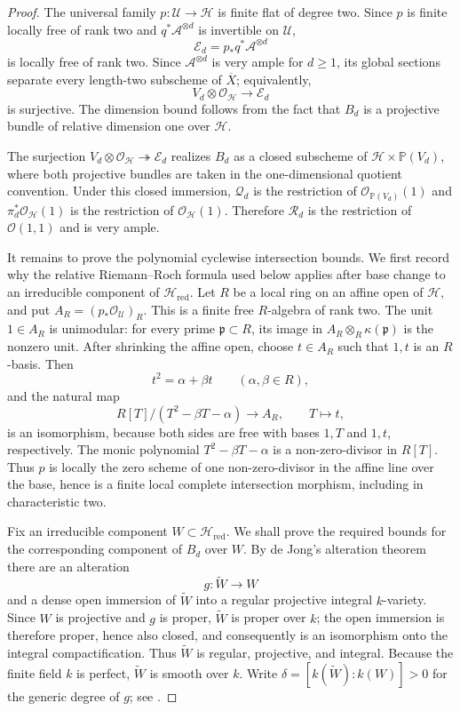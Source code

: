 \documentclass{lms}
\newcommand{\PP}{\mathbb P}
\newcommand{\Ample}{\mathcal A}
\newcommand{\OO}{\mathcal O}
\newcommand{\barX}{\overline{X}}
\begin{document}
\begin{proof}
The universal family $p:\mathcal U\to\mathcal H$ is finite flat of degree two.  Since $p$ is finite locally free of rank two and $q^*\Ample^{\otimes d}$ is invertible on $\mathcal U$,
\[
        \mathcal E_d=p_*q^*\Ample^{\otimes d}
\]
is locally free of rank two.  Since $\Ample^{\otimes d}$ is very ample for $d\ge1$, its global sections separate every length-two subscheme of $\barX$; equivalently,
\[
        V_d\otimes\OO_{\mathcal H}\longrightarrow \mathcal E_d
\]
is surjective.  The dimension bound follows from the fact that $B_d$ is a projective bundle of relative dimension one over $\mathcal H$.

The surjection $V_d\otimes\OO_{\mathcal H}\twoheadrightarrow\mathcal E_d$ realizes $B_d$ as a closed subscheme of $\mathcal H\times\PP(V_d)$, where both projective bundles are taken in the one-dimensional quotient convention.  Under this closed immersion, $\mathcal Q_d$ is the restriction of $\OO_{\PP(V_d)}(1)$ and $\pi_d^*\OO_{\mathcal H}(1)$ is the restriction of $\OO_{\mathcal H}(1)$.  Therefore $\mathcal R_d$ is the restriction of $\OO(1,1)$ and is very ample.

It remains to prove the polynomial cyclewise intersection bounds.  We first record why the relative Riemann--Roch formula used below applies after base change to an irreducible component of $\mathcal H_{\mathrm{red}}$.  Let $R$ be a local ring on an affine open of $\mathcal H$, and put $A_R=(p_*\OO_{\mathcal U})_R$.  This is a finite free $R$-algebra of rank two.  The unit $1\in A_R$ is unimodular: for every prime $\mathfrak p\subset R$, its image in $A_R\otimes_R\kappa(\mathfrak p)$ is the nonzero unit.  After shrinking the affine open, choose $t\in A_R$ such that $1,t$ is an $R$-basis.  Then
\[
        t^2=\alpha+\beta t
        \qquad(\alpha,\beta\in R),
\]
and the natural map
\[
        R[T]/(T^2-\beta T-\alpha)\longrightarrow A_R,
        \qquad T\longmapsto t,
\]
is an isomorphism, because both sides are free with bases $1,T$ and $1,t$, respectively.  The monic polynomial $T^2-\beta T-\alpha$ is a non-zero-divisor in $R[T]$.  Thus $p$ is locally the zero scheme of one non-zero-divisor in the affine line over the base, hence is a finite local complete intersection morphism, including in characteristic two.

Fix an irreducible component $W\subset\mathcal H_{\mathrm{red}}$.  We shall prove the required bounds for the corresponding component of $B_d$ over $W$.  By de Jong's alteration theorem there are an alteration
\[
        g:\widetilde W\longrightarrow W
\]
and a dense open immersion of $\widetilde W$ into a regular projective integral $k$-variety.  Since $W$ is projective and $g$ is proper, $\widetilde W$ is proper over $k$; the open immersion is therefore proper, hence also closed, and consequently is an isomorphism onto the integral compactification.  Thus $\widetilde W$ is regular, projective, and integral.  Because the finite field $k$ is perfect, $\widetilde W$ is smooth over $k$.  Write $\delta=[k(\widetilde W):k(W)]>0$ for the generic degree of $g$; see \cite[Theorem 4.1 and \S4.7]{deJong1996}.


\end{proof}
\end{document}
